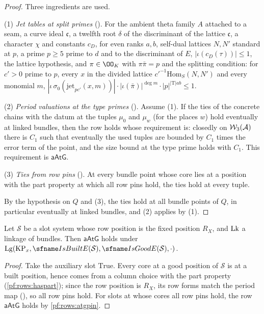 \begin{proof}
Three ingredients are used.

(1) \emph{Jet tables at split primes} (). For the ambient theta family $A$
attached to a seam, a curve ideal $\mathfrak c$, a twelfth root $\delta$ of the discriminant of the lattice $\mathfrak c$, a
character $\chi$ and constants $c_D$, for even ranks $a,b$, self-dual lattices $N,N'$ standard at $p$, a prime $p\ge5$ prime to
$d$ and to the discriminant of $E$, $|\iota(c_D(\tau))|\le1$, the lattice hypothesis, and $\pi\in\OO_K$ with $\pi\bar\pi=p$ and the
splitting condition: for $c'>0$ prime to $p$, every $x$ in the divided lattice $c'^{-1}\mathrm{Hom}_S(N,N')$ and every
monomial $m$, $|\iota\,\sigma_0(\mathrm{jet}_{pc'}(x,m))|\cdot|\iota(\bar\pi)|^{\deg m}\cdot|p|^{|\mathrm T|ab}\le1$.

(2) \emph{Period valuations at the type primes} ().
Assume (1). If the ties of the concrete chains with the datum at the tuples $\mu_0$ and $\mu_w$ (for the places $w$) hold
eventually at linked bundles, then the row holds whose requirement is: closedly on $\mathcal{W}_3(\mathcal A)$ there is $C_1$ such
that eventually the used tuples are bounded by $C_1$ times the error term of the point, and the size bound at the type prime
holds with $C_1$. This requirement is $\mathsf{aAtG}$.

(3) \emph{Ties from row pins} (). At every bundle
point whose core lies at a position with the part property at which all row pins hold, the ties hold at every tuple.

By the hypothesis on $Q$ and (3), the ties hold at all bundle points of $Q$, in particular eventually at linked bundles, and
(2) applies by (1).
\end{proof}

\begin{proposition}\label{pf:rows:atg}
Let $\mathcal S$ be a slot system whose row position is the fixed position $R_X$, and $\mathrm{Lk}$ a linkage of bundles. Then
$\mathsf{aAtG}$ holds under $\rowsLg(\rowsKPx,\rowsBuilt(\mathcal S),\rowsGood(\mathcal S),\cdot)$.
\end{proposition}

\begin{proof}
Take the auxiliary slot $\mathrm{True}$. Every core at a good position of $\mathcal S$ is at a built position, hence comes from
a column choice with the part property (\cref{pf:rows:haspart}); since the row position is $R_X$, its
row forms match the period map (), so all row pins
hold. For slots at whose cores all row pins hold, the row $\mathsf{aAtG}$ holds by \cref{pf:rows:atgpin}.
\end{proof}

